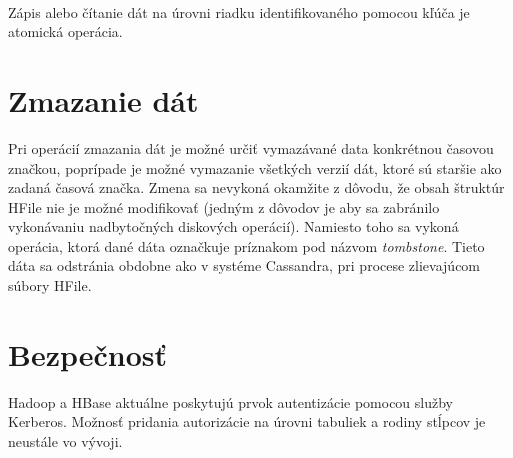 \documentclass[11pt,twoside,a4paper]{book}
\begin{document}
% 
% 
\noindent
\\
Zápis alebo čítanie dát na úrovni riadku identifikovaného pomocou kľúča je atomická operácia. 


\section{Zmazanie dát}

Pri operácií zmazania dát je možné určiť vymazávané data konkrétnou časovou značkou, poprípade je možné vymazanie všetkých verzií dát, ktoré sú staršie ako zadaná časová značka. Zmena sa nevykoná okamžite z dôvodu, že obsah štruktúr HFile nie je možné modifikovať (jedným z dôvodov je aby sa zabránilo vykonávaniu nadbytočných diskových operácií). Namiesto toho sa vykoná operácia, ktorá dané dáta označkuje príznakom pod názvom \emph{tombstone}. Tieto dáta sa odstránia obdobne ako v systéme Cassandra, pri procese zlievajúcom súbory HFile.




\section{Bezpečnosť}

Hadoop a HBase aktuálne poskytujú prvok autentizácie pomocou služby Kerberos. Možnosť pridania autorizácie na úrovni tabuliek a rodiny stĺpcov je neustále vo vývoji. 


% 
% 



% 
% 
% 
% 
% 
% 
% 
\end{document}
